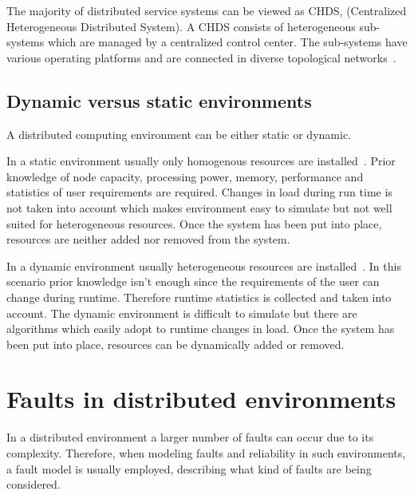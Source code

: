 \documentclass{cslthse-msc}
\begin{document}
The majority of distributed service systems can be viewed as CHDS, (Centralized Heterogeneous Distributed System). A CHDS consists of heterogeneous sub-systems which are managed by a centralized control center. The sub-systems have various operating platforms and are connected in diverse topological networks~\cite{studyServiceRel}.


\subsection{Dynamic versus static environments} \label{subsec:background_dyn_stat_env}
A distributed computing environment can be either static or dynamic.

In a static environment usually only homogenous resources are installed~\cite{compStudyLoadAndCloud}. Prior knowledge of node capacity, processing power, memory, performance and statistics of user requirements are required. Changes in load during run time is not taken into account which makes environment easy to simulate but not well suited for heterogeneous resources. Once the system has been put into place, resources are neither added nor removed from the system.

In a dynamic environment usually heterogeneous resources are installed~\cite{compStudyLoadAndCloud}. In this scenario prior knowledge isn't enough since the requirements of the user can change during runtime. Therefore runtime statistics is collected and taken into account. The dynamic environment is difficult to simulate but there are algorithms which easily adopt to runtime changes in load. Once the system has been put into place, resources can be dynamically added or removed.


\section{Faults in distributed environments} \label{sec:background_faults_distr_env}
In a distributed environment a larger number of faults can occur due to its complexity. Therefore, when modeling faults and reliability in such environments, a fault model is usually employed, describing what kind of faults are being considered.
\end{document}
